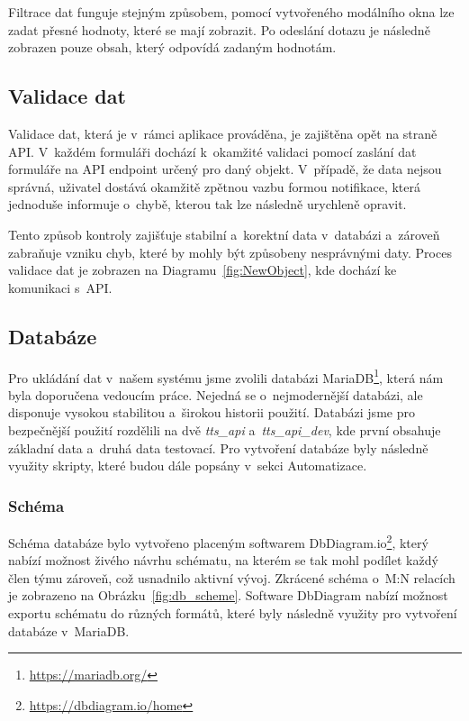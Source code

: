 Filtrace dat funguje stejným způsobem, pomocí vytvořeného modálního okna lze zadat přesné hodnoty, které se mají zobrazit. Po odeslání dotazu je následně zobrazen pouze obsah, který odpovídá zadaným hodnotám.

\subsection{Validace dat}
\label{subsec:implementation-technologies-validation}
Validace dat, která je v~rámci aplikace prováděna, je zajištěna opět na straně API. V~každém formuláři dochází k~okamžité validaci pomocí zaslání dat formuláře na API endpoint určený pro daný objekt. V~případě, že data nejsou správná, uživatel dostává okamžitě zpětnou vazbu formou notifikace, která jednoduše informuje o~chybě, kterou tak lze následně urychleně opravit.

Tento způsob kontroly zajišťuje stabilní a~korektní data v~databázi a~zároveň zabraňuje vzniku chyb, které by mohly být způsobeny nesprávnými daty. Proces validace dat je zobrazen na Diagramu~\ref{fig:NewObject}, kde dochází ke komunikaci s~API\@.

\subsection{Databáze}
\label{subsec:implementation-technologies-database}
Pro ukládání dat v~našem systému jsme zvolili databázi MariaDB\footnote{\href{https://mariadb.org/}{https://mariadb.org/}}, která nám byla doporučena vedoucím práce. Nejedná se o~nejmodernější databázi, ale disponuje vysokou stabilitou a~širokou historii použití. Databázi jsme pro bezpečnější použití rozdělili na dvě \textit{tts\_api} a~\textit{tts\_api\_dev}, kde první obsahuje základní data a~druhá data testovací. Pro vytvoření databáze byly následně využity skripty, které budou dále popsány v~sekci Automatizace.

\subsubsection*{Schéma}
\label{subsubsec:implementation-technologies-database-scheme}
Schéma databáze bylo vytvořeno placeným softwarem DbDiagram.io\footnote{\href{https://dbdiagram.io/home}{https://dbdiagram.io/home}}, který nabízí možnost živého návrhu schématu, na kterém se tak mohl podílet každý člen týmu zároveň, což usnadnilo aktivní vývoj. Zkrácené schéma o~M:N relacích je zobrazeno na Obrázku~\ref{fig:db_scheme}. Software DbDiagram nabízí možnost exportu schématu do různých formátů, které byly následně využity pro vytvoření databáze v~MariaDB\@.

